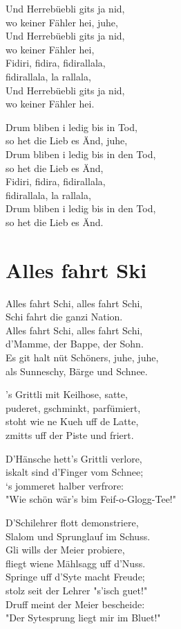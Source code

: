 \documentclass[
  letterpaper,
  twoside=false]{scrbook}
\begin{document}
Und Herrebüebli git\textquotesingle s ja nid,\\
wo keiner Fähler hei, juhe,\\
Und Herrebüebli git\textquotesingle s ja nid,\\
wo keiner Fähler hei,\\
Fidiri, fidira, fidirallala,\\
fidirallala, la rallala,\\
Und Herrebüebli git\textquotesingle s ja nid,\\
wo keiner Fähler hei.

Drum bliben i ledig bis in Tod,\\
so het die Lieb es Änd, juhe,\\
Drum bliben i ledig bis in den Tod,\\
so het die Lieb es Änd,\\
Fidiri, fidira, fidirallala,\\
fidirallala, la rallala,\\
Drum bliben i ledig bis in den Tod,\\
so het die Lieb es Änd.

\hypertarget{alles-fahrt-ski}{%
\chapter{Alles fahrt Ski}\label{alles-fahrt-ski}}

Alles fahrt Schi, alles fahrt Schi,\\
Schi fahrt die ganzi Nation.\\
Alles fahrt Schi, alles fahrt Schi,\\
d'Mamme, der Bappe, der Sohn.\\
Es git halt nüt Schöners, juhe, juhe,\\
als Sunneschy, Bärge und Schnee.

's Grittli mit Keilhose, satte,\\
puderet, gschminkt, parfümiert,\\
stoht wie ne Kueh uff de Latte,\\
zmitts uff der Piste und friert.

D'Hänsche hett's Grittli verlore,\\
iskalt sind d'Finger vom Schnee;\\
`s jommeret halber verfrore:\\
"Wie schön wär's bim Feif-o-Glogg-Tee!"

D'Schilehrer flott demonstriere,\\
Slalom und Sprunglauf im Schuss.\\
Gli wills der Meier probiere,\\
fliegt wiene Mählsagg uff d'Nuss.\\
Springe uff d'Syte macht Freude;\\
stolz seit der Lehrer "s'isch guet!"\\
Druff meint der Meier bescheide:\\
"Der Sytesprung liegt mir im Bluet!"
\end{document}
